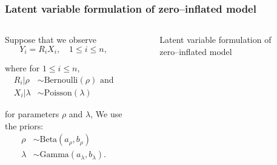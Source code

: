\documentclass{beamer}
\begin{document}
\begin{frame}
	\frametitle{Latent variable formulation of zero--inflated model}
					
	\begin{columns}
		\begin{column}{0.7 \textwidth}
													
			Suppose that we observe
			$$
			Y_i = R_i X_i, \quad 1\le i\le n,
			$$
													
			\noindent where for $1\le i\le n$,
			\begin{align*} 
				R_i | \rho    & \sim \text{Bernoulli}(\rho) \text{ and} \\
				X_i | \lambda & \sim \text{Poisson}(\lambda)            
			\end{align*}
													
			\noindent for parameters $\rho$ and $\lambda$,
			We use the priors:
			\begin{align*} 
				\rho    & \sim \text{Beta}(a_\rho, b_\rho)         \\
				\lambda & \sim \text{Gamma}(a_\lambda, b_\lambda). 
			\end{align*}
		\end{column}
								
		\begin{column}{0.2 \textwidth}
			\begin{figure}
				\caption{Latent variable formulation of zero--inflated model}
			\end{figure}
		\end{column}
	\end{columns}
\end{frame}
\end{document}
